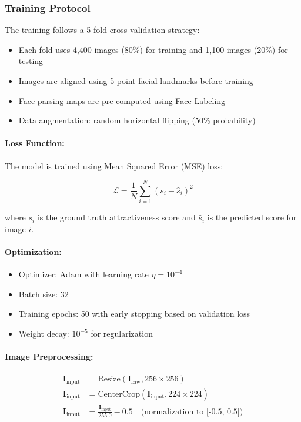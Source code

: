 \subsubsection{Training Protocol}

The training follows a 5-fold cross-validation strategy:
\begin{itemize}
    \item Each fold uses 4,400 images (80\%) for training and 1,100 images (20\%) for testing
    \item Images are aligned using 5-point facial landmarks before training
    \item Face parsing maps are pre-computed using Face Labeling \cite{face_parsing_2016}
    \item Data augmentation: random horizontal flipping (50\% probability)
\end{itemize}

\paragraph{Loss Function:}
The model is trained using Mean Squared Error (MSE) loss:

\begin{equation}
\mathcal{L} = \frac{1}{N} \sum_{i=1}^{N} (s_i - \hat{s}_i)^2
\end{equation}

where $s_i$ is the ground truth attractiveness score and $\hat{s}_i$ is the predicted score for image $i$.

\paragraph{Optimization:}
\begin{itemize}
    \item Optimizer: Adam with learning rate $\eta = 10^{-4}$
    \item Batch size: 32
    \item Training epochs: 50 with early stopping based on validation loss
    \item Weight decay: $10^{-5}$ for regularization
\end{itemize}

\paragraph{Image Preprocessing:}
\begin{align}
\mathbf{I}_{\text{input}} &= \text{Resize}(\mathbf{I}_{\text{raw}}, 256 \times 256) \\
\mathbf{I}_{\text{input}} &= \text{CenterCrop}(\mathbf{I}_{\text{input}}, 224 \times 224) \\
\mathbf{I}_{\text{input}} &= \frac{\mathbf{I}_{\text{input}}}{255.0} - 0.5 \quad \text{(normalization to [-0.5, 0.5])}
\end{align}

